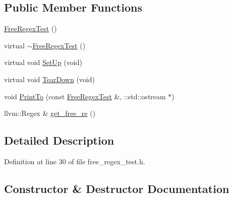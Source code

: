 \subsection*{Public Member Functions}
\begin{DoxyCompactItemize}
\item 
\hyperlink{classclang_1_1tidy_1_1pagesjaunes_1_1test_1_1_free_regex_test_a8a4447add9356782f65049a274bb1dee}{Free\+Regex\+Test} ()
\item 
virtual \hyperlink{classclang_1_1tidy_1_1pagesjaunes_1_1test_1_1_free_regex_test_a074a1b79a4d0013042a7c1e6da42b985}{$\sim$\+Free\+Regex\+Test} ()
\item 
virtual void \hyperlink{classclang_1_1tidy_1_1pagesjaunes_1_1test_1_1_free_regex_test_a890d2e277f032aa2b39ae842f3724f61}{Set\+Up} (void)
\item 
virtual void \hyperlink{classclang_1_1tidy_1_1pagesjaunes_1_1test_1_1_free_regex_test_a2d14369ffac4dca3369702fa4ab95434}{Tear\+Down} (void)
\item 
void \hyperlink{classclang_1_1tidy_1_1pagesjaunes_1_1test_1_1_free_regex_test_a51de645cbcb18a8e6631291cafe5219c}{Print\+To} (const \hyperlink{classclang_1_1tidy_1_1pagesjaunes_1_1test_1_1_free_regex_test}{Free\+Regex\+Test} \&, \+::std\+::ostream $\ast$)
\item 
llvm\+::\+Regex \& \hyperlink{classclang_1_1tidy_1_1pagesjaunes_1_1test_1_1_free_regex_test_a76b3ec496589108b3e55c5fea7156a9d}{get\+\_\+free\+\_\+re} ()
\end{DoxyCompactItemize}


\subsection{Detailed Description}


Definition at line 30 of file free\+\_\+regex\+\_\+test.\+h.



\subsection{Constructor \& Destructor Documentation}
\mbox{\label{classclang_1_1tidy_1_1pagesjaunes_1_1test_1_1_free_regex_test_a8a4447add9356782f65049a274bb1dee}} 
